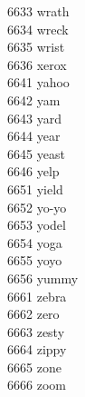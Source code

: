 6633 wrath \\
6634 wreck \\
6635 wrist \\
6636 xerox \\
6641 yahoo \\
6642 yam \\
6643 yard \\
6644 year \\
6645 yeast \\
6646 yelp \\
6651 yield \\
6652 yo-yo \\
6653 yodel \\
6654 yoga \\
6655 yoyo \\
6656 yummy \\
6661 zebra \\
6662 zero \\
6663 zesty \\
6664 zippy \\
6665 zone \\
6666 zoom \\
